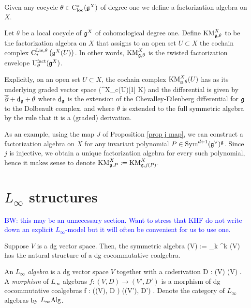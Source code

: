 \documentclass[10pt]{amsart}
\def\brian{\textcolor{blue}{BW: }\textcolor{blue}}
\begin{document}
Given any cocycle $\theta \in {\rm C}_{\rm loc}^*(\mathfrak g^X)$ of degree one we define a factorization algebra on $X$. 

\begin{dfn} Let $\theta$ be a local cocycle of $\mathfrak g^X$ of cohomological degree one. Define ${\rm KM}_{\mathfrak g,\theta}^X$ to be the factorization algebra on $X$ that assigns to an open set $U \subset X$ the cochain complex ${\rm C}^{{\rm Lie}, \theta}_*\left(\mathfrak g^X(U)\right)$. In other words, ${\rm KM}^X_{\mathfrak g,\theta}$ is the twisted factorization envelope ${\rm U}^{\rm fact}_\theta(\mathfrak g^X)$. 
\end{dfn}

Explicitly, on an open set $U \subset X$, the cochain complex ${\rm KM}^X_{\mathfrak g,\theta}(U)$ has as its underlying graded vector space
\ben
\Sym\left(\fg^X_{c}(U)[1] \oplus \CC \cdot K\right)
\een
and the differential is given by $\overline{\partial} + {\rm d}_\mathfrak g + \theta$ where ${\rm d}_\mathfrak g$ is the extension of the Chevalley-Eilenberg differential for $\mathfrak g$ to the Dolbeault complex, and where $\theta$ is extended to the full symmetric algebra by the rule that it is a (graded) derivation. 

\begin{eg} As an example, using the map $J$ of Proposition \ref{prop j map}, we can construct a factorization algebra on $X$ for any invariant polynomial $P \in {\rm Sym}^{d+1}(\mathfrak g^\vee)^\mathfrak g$. Since $j$ is injective, we obtain a unique factorization algebra for every such polynomial, hence it makes sense to denote ${\rm KM}^X_{\mathfrak g, P} := {\rm KM}^X_{\mathfrak g,j(P)}$. 
\end{eg}

\appendix

\section{$L_\infty$ structures}

\brian{this may be an unnecessary section. Want to stress that KHF do not write down an explicit $L_\infty$-model but it will often be convenient for us to use one.}

Suppose $V$ is a dg vector space. Then, the symmetric algebra 
\ben
\Sym(V) := \prod_{k} \Sym^{k} (V)
\een
has the natural structure of a dg cocommutative coalgebra.

\begin{dfn} An {\em $L_\infty$ algebra} is a dg vector space $V$ together with a coderivation
\ben
D : \Sym(V) \to \Sym(V) .
\een
A {\em morphism} of $L_\infty$ algebras $f : (V,D) \to (V',D')$ is a morphism of dg cocommutative coalgebras
\ben
f : \left(\Sym(V), D \right) \to \left(\Sym(V'), D'\right) .
\een
Denote the category of $L_\infty$ algebras by $L_\infty{\rm Alg}$. 
\end{dfn}
\end{document}
